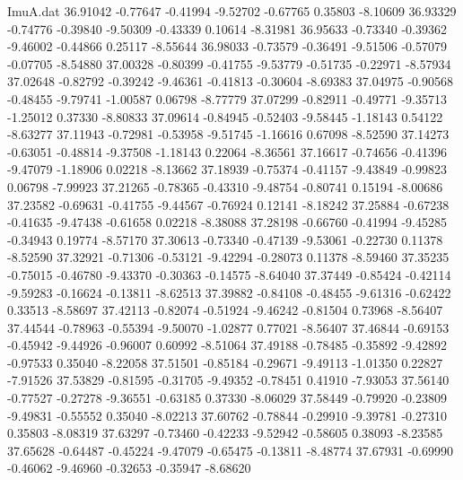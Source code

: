 \begin{filecontents}{ImuA.dat}
  36.91042   -0.77647   -0.41994   -9.52702   -0.67765    0.35803   -8.10609
  36.93329   -0.74776   -0.39840   -9.50309   -0.43339    0.10614   -8.31981
  36.95633   -0.73340   -0.39362   -9.46002   -0.44866    0.25117   -8.55644
  36.98033   -0.73579   -0.36491   -9.51506   -0.57079   -0.07705   -8.54880
  37.00328   -0.80399   -0.41755   -9.53779   -0.51735   -0.22971   -8.57934
  37.02648   -0.82792   -0.39242   -9.46361   -0.41813   -0.30604   -8.69383
  37.04975   -0.90568   -0.48455   -9.79741   -1.00587    0.06798   -8.77779
  37.07299   -0.82911   -0.49771   -9.35713   -1.25012    0.37330   -8.80833
  37.09614   -0.84945   -0.52403   -9.58445   -1.18143    0.54122   -8.63277
  37.11943   -0.72981   -0.53958   -9.51745   -1.16616    0.67098   -8.52590
  37.14273   -0.63051   -0.48814   -9.37508   -1.18143    0.22064   -8.36561
  37.16617   -0.74656   -0.41396   -9.47079   -1.18906    0.02218   -8.13662
  37.18939   -0.75374   -0.41157   -9.43849   -0.99823    0.06798   -7.99923
  37.21265   -0.78365   -0.43310   -9.48754   -0.80741    0.15194   -8.00686
  37.23582   -0.69631   -0.41755   -9.44567   -0.76924    0.12141   -8.18242
  37.25884   -0.67238   -0.41635   -9.47438   -0.61658    0.02218   -8.38088
  37.28198   -0.66760   -0.41994   -9.45285   -0.34943    0.19774   -8.57170
  37.30613   -0.73340   -0.47139   -9.53061   -0.22730    0.11378   -8.52590
  37.32921   -0.71306   -0.53121   -9.42294   -0.28073    0.11378   -8.59460
  37.35235   -0.75015   -0.46780   -9.43370   -0.30363   -0.14575   -8.64040
  37.37449   -0.85424   -0.42114   -9.59283   -0.16624   -0.13811   -8.62513
  37.39882   -0.84108   -0.48455   -9.61316   -0.62422    0.33513   -8.58697
  37.42113   -0.82074   -0.51924   -9.46242   -0.81504    0.73968   -8.56407
  37.44544   -0.78963   -0.55394   -9.50070   -1.02877    0.77021   -8.56407
  37.46844   -0.69153   -0.45942   -9.44926   -0.96007    0.60992   -8.51064
  37.49188   -0.78485   -0.35892   -9.42892   -0.97533    0.35040   -8.22058
  37.51501   -0.85184   -0.29671   -9.49113   -1.01350    0.22827   -7.91526
  37.53829   -0.81595   -0.31705   -9.49352   -0.78451    0.41910   -7.93053
  37.56140   -0.77527   -0.27278   -9.36551   -0.63185    0.37330   -8.06029
  37.58449   -0.79920   -0.23809   -9.49831   -0.55552    0.35040   -8.02213
  37.60762   -0.78844   -0.29910   -9.39781   -0.27310    0.35803   -8.08319
  37.63297   -0.73460   -0.42233   -9.52942   -0.58605    0.38093   -8.23585
  37.65628   -0.64487   -0.45224   -9.47079   -0.65475   -0.13811   -8.48774
  37.67931   -0.69990   -0.46062   -9.46960   -0.32653   -0.35947   -8.68620

\end{filecontents}
